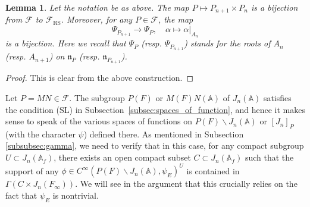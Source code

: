 \documentclass[letterpaper,11pt]{amsart}
\newcommand{\fn}{\mathfrak{n}}
\newcommand{\bA}{\mathbb{A}}
\newcommand{\cF}{\mathcal{F}}
\newcommand{\bs}{\backslash}
\newcommand{\<}{\negthickspace}
\theoremstyle{definition}
\theoremstyle{plain}
\newtheorem{lemma}[definition]{Lemma}
\theoremstyle{remark}
\numberwithin{equation}{section}
\begin{document}
\begin{lemma}   \label{lemma:RS_parabolic_bijection}
Let the notation be as above. The map $P \mapsto P_{n+1} \times P_n$ is a bijection
from $\cF$ to $\cF_{\mathrm{RS}}$. Moreover, for any $P  \in \cF$, the map
    \[
    \Psi_{P_{n+1}} \to \Psi_{P} , \quad \alpha \mapsto \alpha|_{A_n}
    \]
is a bijection. Here we recall that $\Psi_P$ (resp. $\Psi_{P_{n+1}}$)
stands for the roots of $A_n$ (resp. $A_{n+1}$) on $\fn_{P}$ (resp. $\fn_{P_{n+1}}$).
\end{lemma}

\begin{proof}

This is clear from the above construction.
\end{proof}


Let $P = MN \in \cF$. The subgroup $P(F)$
or $M(F)N(\bA)$ of $J_n(\bA)$ satisfies the condition (SL) in
Subsection~\ref{subsec:spaces_of_function}, and hence it makes sense to speak of the various spaces of functions on $P(F) \bs J_n(\bA)$ or $[J_n]_P$ (with the character $\psi$) defined there. As mentioned in Subsection \ref{subsubsec:gamma}, we need to verify that in this case, for any compact subgroup $U \subset J_n(\bA_f)$, there exists an open compact subset $C \subset J_n(\bA_f)$ such
that the support of any $\phi \in C^\infty(P(F) \bs J_n(\bA), \psi_E)^U$ is contained in
$\Gamma (C \times J_n(F_\infty))$. We will see in the argument
that this crucially relies on the fact that $\psi_E$ is nontrivial.
\end{document}
